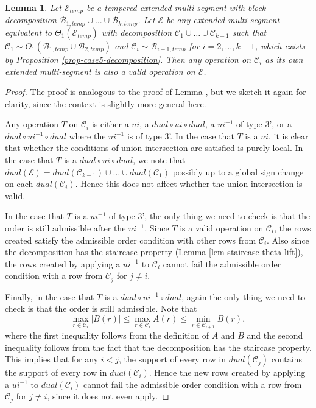 \documentclass[11pt,letterpaper]{amsart}
\newcommand{\inv}{^{-1}}
\newcommand{\BB}{\mathcal{B}}
\newcommand{\CC}{\mathcal{C}}
\newcommand{\EE}{\mathcal{E}}
\newtheorem{lemma}[thm]{Lemma}
\numberwithin{equation}{section}
\begin{document}
\begin{lemma}
\label{lem-existence-theta-lift}
    Let $\EE_{temp}$ be a tempered extended multi-segment with block decomposition $\BB_{1, temp} \cup \dots \cup \BB_{k, temp}$. Let $\EE$ be any extended multi-segment equivalent to $\Theta_1(\EE_{temp})$ with decomposition $\CC_1 \cup \dots \cup \CC_{k-1}$ such that $\CC_1 \sim \Theta_1(\BB_{1, temp} \cup \BB_{2, temp})$ and $\CC_i \sim \BB_{i+1, temp}$ for $i = 2, \dots, k-1$, which exists by Proposition \ref{prop-case5-decomposition}. Then any operation on $\CC_i$ as its own extended multi-segment is also a valid operation on $\EE$.
\end{lemma}
\begin{proof}
    The proof is analogous to the proof of Lemma \cite[Lemma 7.6]{HKT26}, but we sketch it again for clarity, since the context is slightly more general here.
    
    Any operation $T$ on $\CC_i$ is either a $ui$, a $dual \circ ui \circ dual$, a $ui\inv$ of type 3', or a $dual \circ ui\inv \circ dual$ where the $ui\inv$ is of type 3'. In the case that $T$ is a $ui$, it is clear that whether the conditions of union-intersection are satisfied is purely local. In the case that $T$ is a $dual \circ ui \circ dual$, we note that $dual(\EE) = dual(\CC_{k-1}) \cup \dots \cup dual(\CC_1)$ possibly up to a global sign change on each $dual(\CC_i)$. Hence this does not affect whether the union-intersection is valid.

    In the case that $T$ is a $ui\inv$ of type 3', the only thing we need to check is that the order is still admissible after the $ui\inv$. Since $T$ is a valid operation on $\CC_i$, the rows created satisfy the admissible order condition with other rows from $\CC_i$. Also since the decomposition has the staircase property (Lemma \ref{lem-staircase-theta-lift}), the rows created by applying a $ui\inv$ to $\CC_i$ cannot fail the admissible order condition with a row from $\CC_j$ for $j \neq i$.

    Finally, in the case that $T$ is a $dual \circ ui\inv \circ dual$, again the only thing we need to check is that the order is still admissible. Note that \[\max_{r \in \CC_i} |B(r)| \leq \max_{r \in \CC_i} A(r) \leq \min_{r \in \CC_{i+1}} B(r),\] where the first inequality follows from the definition of $A$ and $B$ and the second inequality follows from the fact that the decomposition has the staircase property. This implies that for any $i<j$, the support of every row in $dual(\CC_j)$ contains the support of every row in $dual(\CC_i)$. Hence the new rows created by applying a $ui\inv$ to $dual(\CC_i)$ cannot fail the admissible order condition with a row from $\CC_j$ for $j \neq i$, since it does not even apply.
\end{proof}
\end{document}
